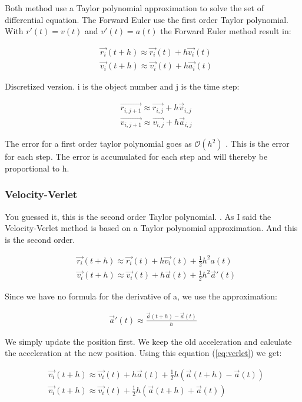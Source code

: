 Both method use a Taylor polynomial approximation to solve the set of differential equation. The Forward Euler use the first order Taylor polynomial. With $r'(t) = v(t)$ and $v'(t) = a(t)$ the Forward Euler method result in: 
 
\begin{align}
	&\vec{r_i}(t+h) \approx \vec{r_i}(t) + h \vec{v_i}(t)
	\\
	&\vec{v_i}(t+h) \approx \vec{v_i}(t) + h \vec{a_i}(t)
\end{align}

Discretized version. i is the object number and j is the time step:

\begin{align*}
	&\vec{r_{i,j+1}} \approx \vec{r_{i,j}} + h \vec{v}_{i,j}
	\\
	&\vec{v_{i,j+1}} \approx \vec{v_{i,j}} + h \vec{a}_{i,j}
\end{align*}

The error for a first order taylor polynomial goes as $\mathcal{O}(h^2)$ . This is the error for each step. The error is accumulated for each step and will thereby be proportional to h. 

\subsubsection{Velocity-Verlet}

You guessed it, this is the second order Taylor polynomial. . As I said the Velocity-Verlet method is based on a Taylor polynomial approximation. And this is the second order. 

\begin{align}
	&\vec{r_i}(t+h) \approx \vec{r_i}(t) + h \vec{v_i}(t) + \frac{1}{2} h^2 a(t)
	\\
	&\vec{v_i}(t+h) \approx \vec{v_i}(t) + h \vec{a}(t) + \frac{1}{2} h^2 \vec{a}'(t)
	\label{eq:verlet}
\end{align}

Since we have no formula for the derivative of a, we use the approximation: 

\begin{align*}
	\vec{a}'(t) \approx \frac{\vec{a}(t+h) - \vec{a}(t)}{h}
\end{align*}

We simply update the position first. We keep the old acceleration and calculate the acceleration at the new position.  Using this equation (\ref{eq:verlet}) we get: 

\begin{align*}
	&\vec{v_i}(t+h) \approx \vec{v_i}(t) + h \vec{a}(t) + \frac{1}{2} h(\vec{a}(t+h) - \vec{a}(t))
	\\
	&\vec{v_i}(t+h) \approx \vec{v_i}(t) + \frac{1}{2} h(\vec{a}(t+h) + \vec{a}(t))
\end{align*}

